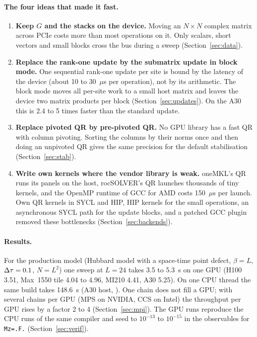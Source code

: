 \paragraph{The four ideas that made it fast.}
\begin{enumerate}
\item \textbf{Keep $G$ and the stacks on the device.} Moving an $N\times N$ complex matrix across PCIe costs more than most operations on it. Only scalars, short vectors and small blocks cross the bus during a sweep (Section~\ref{sec:data}).
\item \textbf{Replace the rank-one update by the submatrix update in block mode.} One sequential rank-one update per site is bound by the latency of the device (about 10 to 30~$\mu$s per operation), not by its arithmetic. The block mode moves all per-site work to a small host matrix and leaves the device two matrix products per block (Section~\ref{sec:updates}). On the A30 this is 2.4 to 5 times faster than the standard update.
\item \textbf{Replace pivoted QR by pre-pivoted QR.} No GPU library has a fast QR with column pivoting. Sorting the columns by their norms once and then doing an unpivoted QR gives the same precision for the default stabilisation (Section~\ref{sec:stab}).
\item \textbf{Write own kernels where the vendor library is weak.} oneMKL's QR runs its panels on the host, rocSOLVER's QR launches thousands of tiny kernels, and the OpenMP runtime of GCC for AMD costs 150~$\mu$s per launch. Own QR kernels in SYCL and HIP, HIP kernels for the small operations, an asynchronous SYCL path for the update blocks, and a patched GCC plugin removed these bottlenecks (Section~\ref{sec:backends}).
\end{enumerate}

\paragraph{Results.} For the production model (Hubbard model with a space-time point defect, $\beta=L$, $\Delta\tau=0.1$, $N=L^2$) one sweep at $L=24$ takes 3.5 to 5.3~s on one GPU (H100 3.51, Max~1550 tile 4.04 to 4.96, MI210 4.41, A30 5.25). %
On one CPU thread the same build takes 148.6~s (A30 host, ). %
One chain does not fill a GPU; with several chains per GPU (MPS on NVIDIA, CCS on Intel) the throughput per GPU rises by a factor 2 to 4 (Section~\ref{sec:mpi}). The GPU runs reproduce the CPU runs of the same compiler and seed to $10^{-13}$ to $10^{-15}$ in the observables for \texttt{Mz=.F.} (Section~\ref{sec:verif}).


